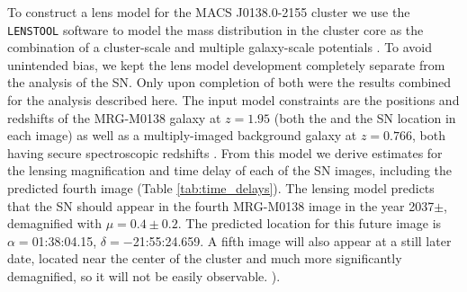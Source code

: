 \documentclass[12pt]{article}
\def\lenstool{{\tt LENSTOOL}\xspace}
\begin{document}
To construct a lens model for the MACS J0138.0-2155 cluster we use the \lenstool software \cite{jullo_bayesian_2007,kneib_lenstool_2011} to model the mass distribution in the cluster core as the combination of a cluster-scale and multiple galaxy-scale potentials 
.
To avoid unintended bias, we kept the lens model development completely separate from the analysis of the SN.  Only upon  completion of both were the results combined for the analysis described here.  The input model constraints are the positions and redshifts of the MRG-M0138 galaxy at $z=1.95$ (both the  and the SN location in each image) as well as a multiply-imaged background 
galaxy at $z=0.766$, both having secure spectroscopic redshifts
.
From this model we derive estimates for the lensing magnification and time delay of each of the SN images, including the predicted fourth image (Table \ref{tab:time_delays}).
The lensing model predicts that the SN should appear in the fourth MRG-M0138 image in the year 2037$\pm$, demagnified with $\mu=0.4\pm0.2$. The predicted location for this future image is $\alpha=$01:38:04.15, $\delta=-$21:55:24.659.
A fifth image will also appear at a still later date, located near the center of the cluster and much more significantly demagnified, so it will not be easily observable.   ).
 
\end{document}
